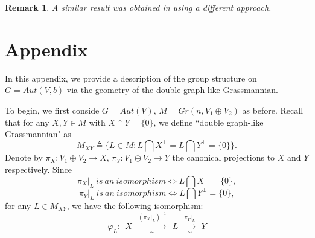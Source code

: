 \documentclass{article}
\newtheorem{rmk}{Remark}[section]
\begin{document}
\begin{rmk}
A similar result was obtained in \cite{C}\cite{CHL} using a different approach.
\end{rmk}





\bigskip
\section{{\large Appendix}}
In this appendix, we provide a description of the group structure on $G=Aut(V,b)$ via the geometry of the double graph-like Grassmannian.

To begin, we first conside $G=Aut(V)$, $M=Gr(n,V_1\oplus V_2)$ as before. Recall that for any $X, Y \in M$ with $X \cap Y=\{0\}$, we define ``double graph-like Grassmannian"  as
\[
M_{XY} \triangleq \{L \in M: L \bigcap X^\bot=L \bigcap Y^\bot=\{0\}\}.
\]
Denote by $\pi_X: V_1\oplus V_2 \rightarrow X$, $\pi_Y: V_1\oplus V_2 \rightarrow Y$  the canonical projections to $X$ and $Y$ respectively. Since
\[
\pi_{X}|_{L} ~ is ~ an ~ isomorphism \Leftrightarrow L \bigcap X^{\bot}=\{0\},
\]
\[
\pi_{Y}|_{L} ~ is ~ an ~ isomorphism \Leftrightarrow L \bigcap Y^{\bot}=\{0\},
\]
for any $L \in M_{XY}$, we have the following isomorphism:
\[
\varphi_{L} :  ~  ~  X  ~  ~  \xrightarrow[\sim]{(\pi_X|_{L})^{-1}}  ~  ~  L   ~  ~   \xrightarrow[\sim]{\pi_Y|_{L}}   ~   ~ Y
\]
\end{document}
